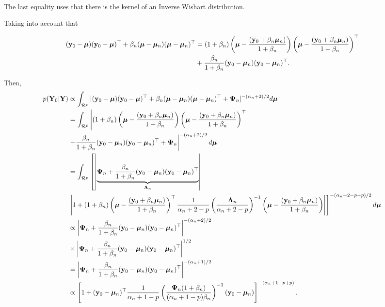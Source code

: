 \begin{enumerate}[leftmargin=*]
The last equality uses that there is the kernel of an Inverse Wishart distribution.

Taking into account that

{\scriptsize{
\begin{align*}
	({\bf{y}}_0-\bm{\mu})({\bf{y}}_0-\bm{\mu})^{\top}+\beta_n(\bm{\mu}-\bm{\mu}_n)(\bm{\mu}-\bm{\mu}_n)^{\top} & = (1+\beta_n)\left(\bm{\mu}-\frac{({\bf{y}}_0+\beta_n\bm{\mu}_n)}{1+\beta_n}\right)\left(\bm{\mu}-\frac{({\bf{y}}_0+\beta_n\bm{\mu}_n)}{1+\beta_n}\right)^{\top}\\
	&+\frac{\beta_n}{1+\beta_n}({\bf{y}}_0-\bm{\mu}_n)({\bf{y}}_0-\bm{\mu}_n)^{\top}.
\end{align*}
}}

Then,
{\scriptsize{
\begin{align*}
	p({\bf{Y}}_0|{\bf{Y}})&\propto\int_{\mathcal{R}^p}|({\bf{y}}_0-\bm{\mu})({\bf{y}}_0-\bm{\mu})^{\top}+\beta_n(\bm{\mu}-\bm{\mu}_n)(\bm{\mu}-\bm{\mu}_n)^{\top}+\mathbf{\Psi}_n|^{-(\alpha_n+2)/2}d\bm{\mu}\\
	&=\int_{\mathcal{R}^p}\left\vert(1+\beta_n)\left(\bm{\mu}-\frac{({\bf{y}}_0+\beta_n\bm{\mu}_n)}{1+\beta_n}\right)\left(\bm{\mu}-\frac{({\bf{y}}_0+\beta_n\bm{\mu}_n)}{1+\beta_n}\right)^{\top}\right.\\
	&\left.+\frac{\beta_n}{1+\beta_n}({\bf{y}}_0-\bm{\mu}_n)({\bf{y}}_0-\bm{\mu}_n)^{\top}+\mathbf{\Psi}_n\right\vert^{-(\alpha_n+2)/2}d\bm{\mu}\\
	&=\int_{\mathcal{R}^p}\left[\left\vert\underbrace{\mathbf{\Psi}_n+\frac{\beta_n}{1+\beta_n}({\bf{y}}_0-\bm{\mu}_n)({\bf{y}}_0-\bm{\mu}_n)^{\top}}_{\mathbf{\Lambda}_n}\right\vert\right.\\
	&\left.\left\vert 1+(1+\beta_n)\left(\bm{\mu}-\frac{({\bf{y}}_0+\beta_n\bm{\mu}_n)}{1+\beta_n}\right)^{\top}\frac{1}{\alpha_n+2-p}\left(\frac{\mathbf{\Lambda}_n}{\alpha_n+2-p}\right)^{-1}\left(\bm{\mu}-\frac{({\bf{y}}_0+\beta_n\bm{\mu}_n)}{1+\beta_n}\right)\right\vert\right]^{-(\alpha_n+2-p+p)/2}d\bm{\mu}\\
	&\propto \left\vert\mathbf{\Psi}_n+\frac{\beta_n}{1+\beta_n}({\bf{y}}_0-\bm{\mu}_n)({\bf{y}}_0-\bm{\mu}_n)^{\top}\right\vert^{-(\alpha_n+2)/2}\\
	&\times \left\vert\mathbf{\Psi}_n+\frac{\beta_n}{1+\beta_n}({\bf{y}}_0-\bm{\mu}_n)({\bf{y}}_0-\bm{\mu}_n)^{\top}\right\vert^{1/2}\\
	&=\left\vert\mathbf{\Psi}_n+\frac{\beta_n}{1+\beta_n}({\bf{y}}_0-\bm{\mu}_n)({\bf{y}}_0-\bm{\mu}_n)^{\top}\right\vert^{-(\alpha_n+1)/2}\\
	&\propto \left[1+({\bf{y}}_0-\bm{\mu}_n)^{\top}\frac{1}{\alpha_n+1-p}\left(\frac{\mathbf{\Psi}_n(1+\beta_n)}{(\alpha_n+1-p)\beta_n}\right)^{-1}({\bf{y}}_0-\bm{\mu}_n)\right]^{-(\alpha_n+1-p+p)}. 
\end{align*} 
}}


\end{enumerate}
